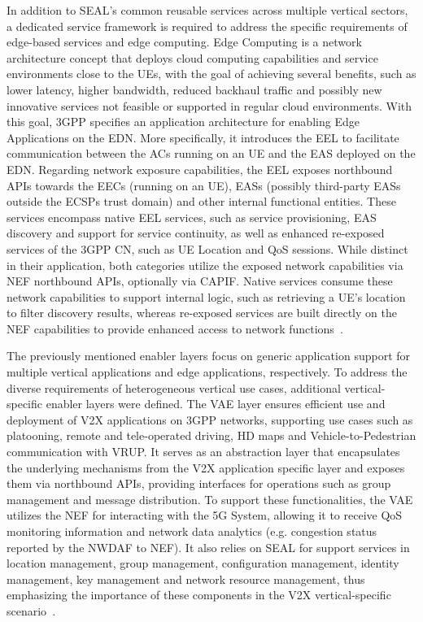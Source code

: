 In addition to \acs{SEAL}'s common reusable services across multiple vertical sectors, a dedicated service framework is required to address the specific requirements of edge-based services and edge computing. Edge Computing is a network architecture concept that deploys cloud computing capabilities and service environments close to the \acsp{UE}, with the goal of achieving several benefits, such as lower latency, higher bandwidth, reduced backhaul traffic and possibly new innovative services not feasible or supported in regular cloud environments. With this goal, \acs{3GPP} specifies an application architecture for enabling Edge Applications on the \acf{EDN}. More specifically, it introduces the \acf{EEL} to facilitate communication between the \acfp{AC} running on an \acs{UE} and the \acf{EAS} deployed on the \acs{EDN}. Regarding network exposure capabilities, the \acs{EEL} exposes northbound \acsp{API} towards the \acsp{EEC} (running on an \acs{UE}), \acsp{EAS} (possibly third-party \acsp{EAS} outside the \acsp{ECSP} trust domain) and other internal functional entities. These services encompass native \acs{EEL} services, such as service provisioning, \acs{EAS} discovery and support for service continuity, as well as enhanced re-exposed services of the \acs{3GPP} \acs{CN}, such as \acs{UE} Location and \acs{QoS} sessions. While distinct in their application, both categories utilize the exposed network capabilities via \acs{NEF} northbound \acsp{API}, optionally via \acs{CAPIF}. Native services consume these network capabilities to support internal logic, such as retrieving a \acs{UE}'s location to filter discovery results, whereas re-exposed services are built directly on the \acs{NEF} capabilities to provide enhanced access to network functions~\cite{ETSI_TS_123_558_V18_11_0_EDGE}.

The previously mentioned enabler layers focus on generic application support for multiple vertical applications and edge applications, respectively. To address the diverse requirements of heterogeneous vertical use cases, additional vertical-specific enabler layers were defined. The \acf{VAE} layer ensures efficient use and deployment of \acs{V2X} applications on \acs{3GPP} networks, supporting use cases such as platooning, remote and tele-operated driving, \acs{HD} maps and Vehicle-to-Pedestrian communication with \acf{VRUP}. It serves as an abstraction layer that encapsulates the underlying mechanisms from the \acs{V2X} application specific layer and exposes them via northbound \acsp{API}, providing interfaces for operations such as group management and message distribution. To support these functionalities, the \acs{VAE} utilizes the \acs{NEF} for interacting with the \acs{5G} System, allowing it to receive \acs{QoS} monitoring information and network data analytics (e.g. congestion status reported by the \acs{NWDAF} to \acs{NEF}). It also relies on \acs{SEAL} for support services in location management, group management, configuration management, identity management, key management and network resource management, thus emphasizing the importance of these components in the \acs{V2X} vertical-specific scenario~\cite{ETSI_TS_123_286_V19_0_0_V2X}.

